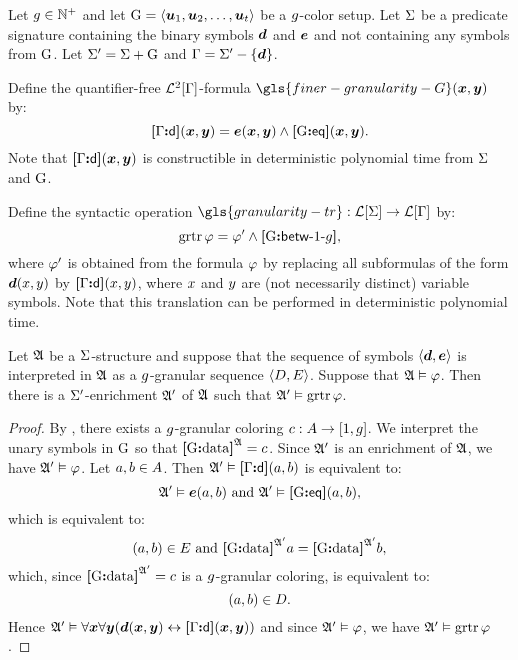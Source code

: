 Let $g \in \mathbb{N}^{+}$ and let ${\mathrm{G}} = \left\langle \bm{u}_{1},\bm{u}_{2},\dots,\bm{u}_{t} \right\rangle$ be a
$g$-color setup.
Let $\mathrm{\Sigma}$ be a predicate signature containing the binary symbols
$\bm{d}$ and $\bm{e}$ and not containing any symbols from ${\mathrm{G}}$.
Let $\mathrm{\Sigma'} = \mathrm{\Sigma} + {\mathrm{G}}$ and $\mathrm{\Gamma} = \mathrm{\Sigma'} - \left\{\bm{d}\right\}$.

\begin{definition}
Define the quantifier-free $\mathcal{L}^{2}[\mathrm{\Gamma}]$-formula
$\gls{finer-granularity-G}(\xx,\yy)$ by:
\[
  {\bm{[}\mathrm{\Gamma}\mathord{\bm{:}}\mathsf{d}\bm{]}}(\bm{x},\bm{y}) = \bm{e}(\bm{x},\bm{y}) \land {\bm{[}{\mathrm{G}}\mathord{\bm{:}}\mathsf{eq}\bm{]}}(\bm{x},\bm{y}).
\]
Note that ${\bm{[}\mathrm{\Gamma}\mathord{\bm{:}}\mathsf{d}\bm{]}}(\bm{x},\bm{y})$ is constructible in deterministic polynomial time
from $\mathrm{\Sigma}$ and ${\mathrm{G}}$.
\end{definition}
\begin{definition}
Define the syntactic operation
$\gls{granularity-tr} : \FoF\SigS \to \FoF\SigG$ by:
\[
  \operatorname{grtr}\varphi = {\varphi'} \land {\bm{[}{\mathrm{G}}\mathord{\bm{:}}\mathsf{betw}{\hbox{-}}1{\hbox{-}}g\bm{]}},
\]
where ${\varphi'}$ is obtained from the formula $\varphi$ by replacing all subformulas
of the form $\bm{d}(x,y)$ by ${\bm{[}\mathrm{\Gamma}\mathord{\bm{:}}\mathsf{d}\bm{]}}(x,y)$, where $x$ and $y$ are
(not necessarily distinct) variable symbols.
Note that this translation can be performed in deterministic polynomial time.
\end{definition}

\begin{lemma}\label{lem:granular-f-to-tr}
Let $\mathfrak{A}$ be a $\mathrm{\Sigma}$-structure and suppose that the sequence of
symbols $\left\langle \bm{d},\bm{e} \right\rangle$ is interpreted in $\mathfrak{A}$ as a
$g$-granular sequence $\left\langle D,E \right\rangle$.
Suppose that $\mathfrak{A} \vDash \varphi$.
Then there is a $\mathrm{\Sigma'}$-enrichment $\mathfrak{A'}$ of $\mathfrak{A}$ such that
$\mathfrak{A'} \vDash \operatorname{grtr}\varphi$.
\end{lemma}
\begin{proof}
By , there exists a $g$-granular coloring 
$c : A \to [1,g]$.
We interpret the unary symbols in ${\mathrm{G}}$ so that ${\bm{[}{\mathrm{G}}\mathord{\bm{:}}\mathrm{data}\bm{]}}^{\mathfrak{A}} = c$.
Since $\mathfrak{A'}$ is an enrichment of $\mathfrak{A}$, we have $\mathfrak{A'} \vDash \varphi$.
Let $a, b \in A$.
Then $\mathfrak{A'} \vDash {\bm{[}\mathrm{\Gamma}\mathord{\bm{:}}\mathsf{d}\bm{]}}(a,b)$ is equivalent to:
\[
  \mathfrak{A'} \vDash \bm{e}(a,b) \text{ and } \mathfrak{A'} \vDash {\bm{[}{\mathrm{G}}\mathord{\bm{:}}\mathsf{eq}\bm{]}}(a,b),
\]
which is equivalent to:
\[
  (a,b) \in E \text{ and } {\bm{[}{\mathrm{G}}\mathord{\bm{:}}\mathrm{data}\bm{]}}^{\mathfrak{A'}}a = {\bm{[}{\mathrm{G}}\mathord{\bm{:}}\mathrm{data}\bm{]}}^{\mathfrak{A'}}b,
\]
which, since ${\bm{[}{\mathrm{G}}\mathord{\bm{:}}\mathrm{data}\bm{]}}^{\mathfrak{A'}} = c$ is a $g$-granular coloring, is
equivalent to:
\[
  (a,b) \in D.
\]
Hence $\mathfrak{A'} \vDash \forall\bm{x}\forall\bm{y}(\bm{d}(\bm{x},\bm{y}) \leftrightarrow {\bm{[}\mathrm{\Gamma}\mathord{\bm{:}}\mathsf{d}\bm{]}}(\bm{x},\bm{y}))$
and since $\mathfrak{A'} \vDash \varphi$, we have $\mathfrak{A'} \vDash \operatorname{grtr}\varphi$.
\end{proof}


